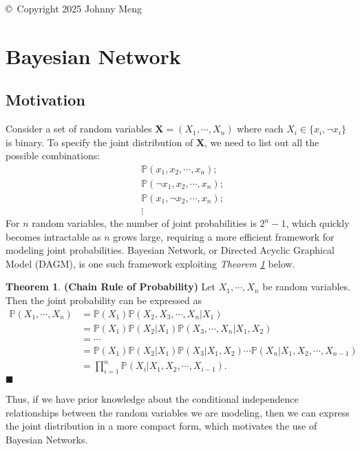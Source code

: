 \documentclass{article}
\theoremstyle{definition}
\newtheorem{theorem}{Theorem}
\newenvironment{theoremqed}
    {\begin{theorem}}
    {\hfill \qedsymbol \end{theorem}}
\renewcommand{\qedsymbol}{\(\blacksquare\)}
\newcommand{\X}{\mathbf{X}}
\renewcommand{\P}{\mathbb{P}}
\begin{document}
\copyright \ Copyright 2025 Johnny Meng

\pagebreak

\section{Bayesian Network}

\subsection{Motivation}

Consider a set of random variables \(\X = (X_1, \cdots, X_n)\) where each \(X_i\in \{x_i, \neg x_i\}\) is binary. To specify the joint distribution of \(\X\), we need to list out all the possible combinations:
\begin{align*}
    &\P(x_1, x_2, \cdots, x_n); \\
    &\P(\neg x_1, x_2, \cdots, x_n); \\
    &\P(x_1, \neg x_2, \cdots, x_n); \\
    &\vdots
\end{align*}
For \(n\) random variables, the number of joint probabilities is \(2^n - 1\), which quickly becomes intractable as \(n\) grows large, requiring a more efficient framework for modeling joint probabilities. Bayesian Network, or Directed Acyclic Graphical Model (DAGM), is one such framework exploiting \textit{Theorem \ref{thm:chain_rule}} below.

\begin{theoremqed} \label{thm:chain_rule}
    \textbf{(Chain Rule of Probability)} Let \(X_1, \cdots, X_n\) be random variables. Then the joint probability can be expressed as
    \begin{align*}
        \P(X_1, \cdots, X_n) &= \P(X_1) \P(X_2, X_3, \cdots, X_n | X_1) \\
        &= \P(X_1) \P(X_2 | X_1) \P(X_3, \cdots, X_n | X_1, X_2) \\
        &= \cdots \\
        &= \P(X_1) \P(X_2 | X_1) \P(X_3 | X_1, X_2) \cdots \P(X_n | X_1, X_2, \cdots, X_{n-1}) \\
        &= \prod_{i=1}^n \P(X_i | X_1, X_2, \cdots, X_{i-1}).
    \end{align*}
\end{theoremqed}

Thus, if we have prior knowledge about the conditional independence relationships between the random variables we are modeling, then we can express the joint distribution in a more compact form, which motivates the use of Bayesian Networks.
\end{document}
